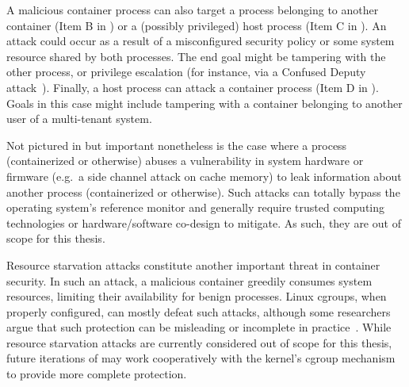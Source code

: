 A malicious container process can also target a process belonging to another container
(Item B in ) or a (possibly privileged) host process (Item C in
). An attack could occur as a result of a misconfigured security
policy or some system resource shared by both processes. The end goal might be tampering
with the other process, or privilege escalation (for instance, via a Confused Deputy
attack~\cite{hardy1988_confused_deputy}). Finally, a host process can attack a container
process (Item D in ). Goals in this case might include tampering
with a container belonging to another user of a multi-tenant system.

Not pictured in  but important nonetheless is the case where
a process (containerized or otherwise) abuses a vulnerability in system hardware or
firmware (e.g.~a side channel attack on cache memory) to leak information about another
process (containerized or otherwise). Such attacks can totally bypass the operating
system's reference monitor and generally require trusted computing technologies or
hardware/software co-design to mitigate. As such, they are out of scope for this thesis.

Resource starvation attacks constitute another important threat in container security. In
such an attack, a malicious container greedily consumes system resources, limiting their
availability for benign processes. Linux cgroups, when properly configured, can mostly
defeat such attacks, although some researchers argue that such protection can be
misleading or incomplete in practice~\cite{gao2019_houdini}. While resource starvation
attacks are currently considered out of scope for this thesis, future iterations of
\bpfcontain{} may work cooperatively with the kernel's cgroup mechanism to provide more
complete protection.


